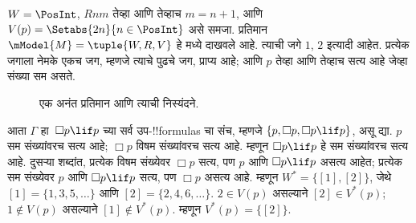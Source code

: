 \documentclass[../../../include/open-logic-section]{subfiles}
\begin{document}
\begin{ex}
  $W = \PosInt$, $Rnm$ तेव्हा आणि तेव्हाच $m = n + 1$,
  आणि $V(p) = \Setabs{2n}{n \in
    \PosInt}$ असे समजा. प्रतिमान~$\mModel{M} = \tuple{W, R, V}$
  हे  मध्ये दाखवले आहे.
  त्याची जगे $1$, $2$ इत्यादी आहेत. प्रत्येक जगाला
  नेमके एकच जग, म्हणजे त्याचे पुढचे जग, प्राप्य आहे;
  आणि $p$ तेव्हा आणि तेव्हाच सत्य आहे जेव्हा संख्या सम असते.

  \begin{figure}
    \centering

    \caption{एक अनंत प्रतिमान आणि त्याची निस्यंदने.}
  \end{figure}

  आता $\Gamma$ हा~$\Box p \lif p$ च्या सर्व
  उप-!!{formula}s चा संच, म्हणजे
  $\{p, \Box p, \Box p \lif p\}$, असू द्या.
  $p$ सम संख्यांवरच सत्य आहे; $\Box p$ विषम
  संख्यांवरच सत्य आहे. म्हणून $\Box p \lif p$
  हे सम संख्यांवरच सत्य आहे. दुसऱ्या शब्दांत,
  प्रत्येक विषम संख्येवर $\Box p$ सत्य, पण $p$
  आणि $\Box p \lif p$ असत्य आहेत; प्रत्येक सम
  संख्येवर $p$ आणि $\Box p \lif p$ सत्य, पण
  $\Box p$ असत्य आहे. म्हणून
  $W^* = \{ [1], [2] \}$, जेथे
  $[1] = \{1, 3, 5, \dots\}$ आणि
  $[2] = \{2, 4, 6, \dots\}$.
  $2 \in V(p)$ असल्याने $[2] \in V^*(p)$;
  $1 \notin V(p)$ असल्याने $[1] \notin V^*(p)$.
  म्हणून $V^*(p) = \{[2]\}$.


\end{ex}
\end{document}
